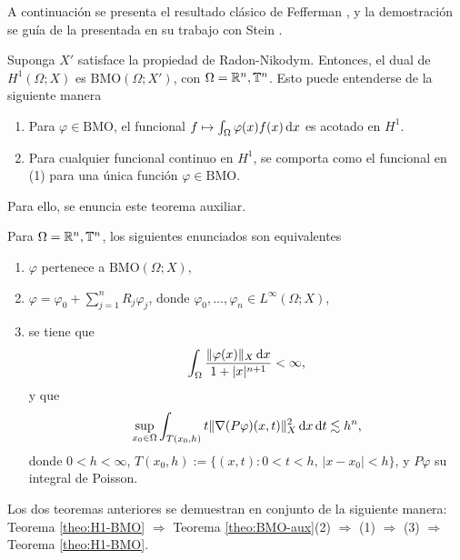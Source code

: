 A continuación se presenta el resultado clásico de Fefferman \cite{fefferman-BMO}, y la demostración se guía de la presentada en su trabajo con Stein \cite{fefferman-stein}.
\begin{theorem}[Fefferman]\label{theo:H1-BMO}
	Suponga $X'$ satisface la propiedad de Radon-Nikodym. Entonces, el dual de $H^1(\Omega;X)$ es $\mathrm{BMO}(\Omega;X')$, con $\Omega=\mathbb{R}^n,\mathbb{T}^n$. Esto puede entenderse de la siguiente manera 
	\begin{enumerate}
		\item Para $\varphi \in \mathrm{BMO}$, el funcional $f\mapsto\int_{\Omega}{\varphi(x) f(x)}\mathop{}\!\mathrm{d} x$ es acotado en $H^1$.
		\item Para cualquier funcional continuo en $H^1$, se comporta como el funcional en (1) para una única función $\varphi \in \mathrm{BMO}$.
	\end{enumerate}
\end{theorem}
Para ello, se enuncia este teorema auxiliar.
\begin{theorem}\label{theo:BMO-aux}
	Para $\Omega=\mathbb{R}^n,\mathbb{T}^n$, los siguientes enunciados son equivalentes
	\begin{enumerate}
		\item $\varphi$ pertenece a $\mathrm{BMO}(\Omega;X)$,
		\item $\varphi = \varphi_0 + \sum_{j=1}^n R_j\varphi_j$, donde $\varphi_0,\ldots,\varphi_n \in L^\infty(\Omega;X)$,
		\item se tiene que
		\begin{equation*}
			\int_{\Omega}\frac{\|\varphi(x)\|_{X}\mathop{}\!\mathrm{d} x}{1+|x|^{n+1}} < \infty, 
		\end{equation*}
		y que 
		\begin{equation*}
			\sup_{x_0\in\Omega}\int_{T(x_0, h)} t\|\nabla (P\varphi)(x, t)\|_{X}^2\mathop{}\!\mathrm{d} x \mathop{}\!\mathrm{d} t \lesssim h^n,
		\end{equation*}
		donde $0<h<\infty$, $T(x_0, h) := \{(x, t): 0<t<h, \, |x-x_0| < h\}$, y $P\varphi$ su integral de Poisson.
	\end{enumerate}
\end{theorem}
Los dos teoremas anteriores se demuestran en conjunto de la siguiente manera: Teorema \ref{theo:H1-BMO} $\Rightarrow$ Teorema \ref{theo:BMO-aux}(2) $\Rightarrow$ (1) $\Rightarrow$ (3) $\Rightarrow$ Teorema \ref{theo:H1-BMO}.
